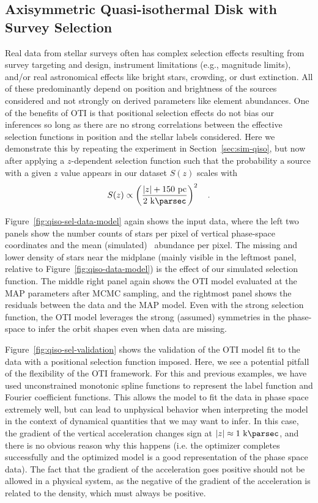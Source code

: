 \subsection{Axisymmetric Quasi-isothermal Disk with Survey Selection}
\label{sec:sim-qiso-sel}

Real data from stellar surveys often has complex selection effects resulting from survey
targeting and design, instrument limitations (e.g., magnitude limits), and/or real
astronomical effects like bright stars, crowding, or dust extinction.
All of these predominantly depend on position and brightness of the sources considered
and not strongly on derived parameters like element abundances.
One of the benefits of OTI is that positional selection effects do not bias our
inferences so long as there are no strong correlations between the effective selection
functions in position and the stellar labels considered.
Here we demonstrate this by repeating the experiment in Section~\ref{sec:sim-qiso}, but
now after applying a $z$-dependent selection function such that the probability a source
with a given $z$ value appears in our dataset $S(z)$ scales with
\begin{equation}
    S(z) \propto \left(\frac{|z| + 150~\unit{pc}}{2~\kpc}\right)^2 \quad .
\end{equation}

Figure~\ref{fig:qiso-sel-data-model} again shows the input data, where the left two
panels show the number counts of stars per pixel of vertical phase-space coordinates and
the mean (simulated) \mgfe\ abundance per pixel.
The missing and lower density of stars near the midplane (mainly visible in the leftmost
panel, relative to Figure~\ref{fig:qiso-data-model}) is the effect of our simulated
selection function.
The middle right panel again shows the OTI model evaluated at the MAP parameters after
MCMC sampling, and the rightmost panel shows the residuals between the data and the MAP
model.
Even with the strong selection function, the OTI model leverages the strong (assumed)
symmetries in the phase-space to infer the orbit shapes even when data are missing.

Figure~\ref{fig:qiso-sel-validation} shows the validation of the OTI model fit to the
data with a positional selection function imposed.
Here, we see a potential pitfall of the flexibility of the OTI framework.
For this and previous examples, we have used unconstrained monotonic spline functions to
represent the label function and Fourier coefficient functions.
This allows the model to fit the data in phase space extremely well, but can lead to
unphysical behavior when interpreting the model in the context of dynamical quantities
that we may want to infer.
In this case, the gradient of the vertical acceleration changes sign at $|z| \approx
1~\kpc$, and there is no obvious reason why this happens (i.e. the optimizer completes
successfully and the optimized model is a good representation of the phase space data).
The fact that the gradient of the acceleration goes positive should not be allowed in a
physical system, as the negative of the gradient of the acceleration is related to the
density, which must always be positive.


